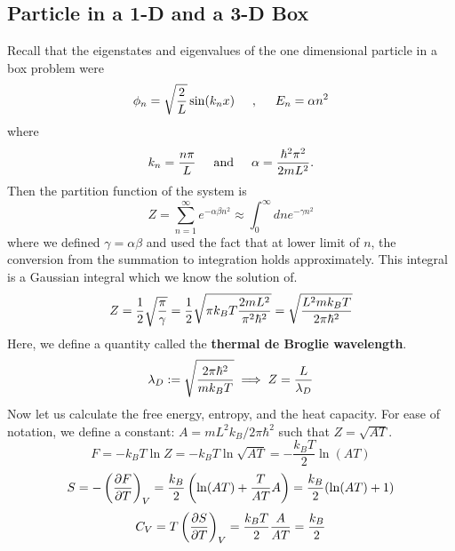 \subsection{Particle in a 1-D and a 3-D Box}
    Recall that the eigenstates and eigenvalues of the one dimensional particle in a box problem were
    \begin{equation}
        \phi_n = \sqrt{\frac{2}{L}}\sin(k_nx) \hspace{0.5cm},\hspace{0.5cm} E_n = \alpha n^2
    \end{equation}
    where
    \begin{equation}
        k_n = \frac{n\pi}{L} \hspace{0.5cm}\mathrm{and}\hspace{0.5cm} \alpha = \frac{\hbar^2\pi^2}{2mL^2}.
    \end{equation}
    Then the partition function of the system is
    \begin{equation}
        Z = \sum_{n=1}^\infty e^{-\alpha\beta n^2} \approx \int_0^\infty dn e^{-\gamma n^2}
    \end{equation}
    where we defined $\gamma = \alpha\beta$ and used the fact that at lower limit of $n$, the conversion from the summation to integration holds approximately. This integral is a Gaussian integral which we know the solution of. 
    \begin{equation}
        Z = \frac{1}{2}\sqrt{\frac{\pi}{\gamma}}=\frac{1}{2}\sqrt{\pi k_BT\frac{2mL^2}{\pi^2\hbar^2}}=\sqrt{\frac{L^2mk_BT}{2\pi\hbar^2}}
    \end{equation}
    Here, we define a quantity called the \textbf{thermal de Broglie wavelength}.
    \begin{equation}
        \lambda_D := \sqrt{\frac{2\pi\hbar^2}{mk_BT}} \implies Z = \frac{L}{\lambda_D}
    \end{equation}
    Now let us calculate the free energy, entropy, and the heat capacity. For ease of notation, we define a constant: $A = mL^2k_B/2\pi\hbar^2$ such that $Z=\sqrt{AT}$.
    \begin{equation}
        F = -k_BT\ln Z = -k_BT\ln\sqrt{AT}=-\frac{k_BT}{2}\ln(AT)
    \end{equation}
    \begin{align}
        S = -\left( \frac{\partial F}{\partial T} \right)_V = \frac{k_B}{2}\left( \ln(AT)+\frac{T}{AT}A \right)=\frac{k_B}{2}(\ln(AT)+1)
    \end{align}
    \begin{equation}
        C_V = T\left( \frac{\partial S}{\partial T} \right)_V = \frac{k_BT}{2}\frac{A}{AT}=\frac{k_B}{2}
    \end{equation}
